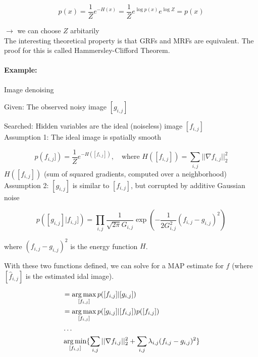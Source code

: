 \begin{equation*}
	p(x) = \frac{1}{Z} e^{-H(x)} = \frac{1}{Z} e^{\log p(x)} e^{\log Z}  = p(x)
\end{equation*}

$\rightarrow$ we can choose $Z$ arbitarily\\

The interesting theoretical property is that GRFs and MRFs are equivalent. The proof for this is called Hammersley-Clifford Theorem.


\paragraph{Example:} Image denoising

Given: The observed noisy image $[g_{i,j}]$

Searched: Hidden variables are the ideal (noiseless) image $[f_{i,j}]$\\

Assumption 1: The ideal image is spatially smooth

\begin{equation*}
	p(f_{i,j}]) = \frac{1}{Z} e^{-H([f_{i,j}])}, \quad \text{where } H([f_{i,j}]) = \sum_{i,j} ||\nabla f_{i,j}||_2^2
\end{equation*}
$ H([f_{i,j}]) $ (sum of squared gradients, computed over a neighborhood)\\

Assumption 2: $[g_{i,j}]$ is similar to $[f_{i,j}]$, but corrupted by additive Gaussian noise

\begin{equation*}
	p([g_{i,j}] | f_{i,j}]) = \prod_{i,j} \frac{1}{\sqrt{2 \pi} G_{i,j}} \exp(- \frac{1}{2 G_{i,j}^2} (f_{i,j} - g_{i,j})^2)
\end{equation*}

where $(f_{i,j} - g_{i,j})^2$ is the energy function $H$.

With these two functions defined, we can solve for a MAP estimate for $f$ (where $[\hat{f}_{i,j}]$ is the estimated idal image).

\begin{align*}
	[\hat{f}_{i,j}] &= \argmax_{[f_{i,j}]} p([f_{i,j}] | [g_{i,j}])\\
					&= \argmax_{[f_{i,j}]} p([g_{i,j}] | [f_{i,j}]) p([f_{i,j}])\\
					& \dots\\
					& \argmin_{[f_{i,j}]} \{ \sum_{i,j} ||\nabla f_{i,j}||_2^2 + \sum_{i,j} \lambda_{i,j} (f_{i,j} - g_{i,j})^2 \}
\end{align*}
